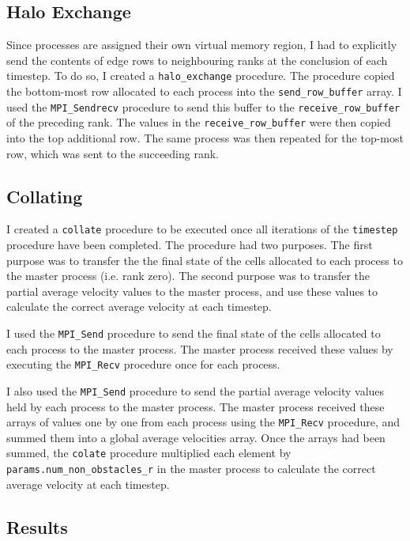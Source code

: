 \documentclass[twocolumn, a4paper]{article}
\begin{document}
\subsection{Halo Exchange}

Since processes are assigned their own virtual memory region, I had to explicitly send the contents of edge rows to neighbouring ranks at the conclusion of each timestep.
To do so, I created a \texttt{halo\_exchange} procedure.
The procedure copied the bottom-most row allocated to each process into the \texttt{send\_row\_buffer} array.
I used the \texttt{MPI\_Sendrecv} procedure to send this buffer to the \texttt{receive\_row\_buffer} of the preceding rank.
The values in the \texttt{receive\_row\_buffer} were then copied into the top additional row.
The same process was then repeated for the top-most row, which was sent to the succeeding rank.

\subsection{Collating}

I created a \texttt{collate} procedure to be executed once all iterations of the \texttt{timestep} procedure have been completed.
The procedure had two purposes.
The first purpose was to transfer the the final state of the cells allocated to each process to the master process (i.e. rank zero).
The second purpose was to transfer the partial average velocity values to the master process, and use these values to calculate the correct average velocity at each timestep.

I used the \texttt{MPI\_Send} procedure to send the final state of the cells allocated to each process to the master process.
The master process received these values by executing the \texttt{MPI\_Recv} procedure once for each process.

I also used the \texttt{MPI\_Send} procedure to send the partial average velocity values held by each process to the master process.
The master process received these arrays of values one by one from each process using the \texttt{MPI\_Recv} procedure, and summed them into a global average velocities array.
Once the arrays had been summed, the \texttt{colate} procedure multiplied each element by \texttt{params.num\_non\_obstacles\_r} in the master process to calculate the correct average velocity at each timestep.

\subsection{Results}
\end{document}

